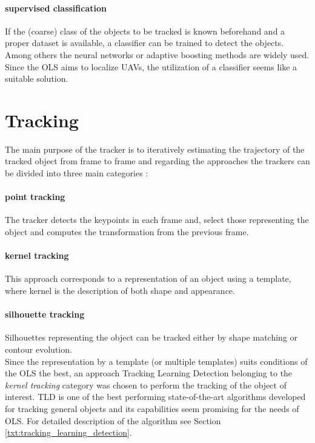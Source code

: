 \paragraph{supervised classification} If the (coarse) class of the objects to be tracked is known beforehand and a proper dataset is available, a classifier can be trained to detect the objects. Among others the neural networks or adaptive boosting methods are widely used. Since the OLS aims to localize UAVs, the utilization of a classifier seems like a suitable solution.

\section{Tracking}

The main purpose of the tracker is to iteratively estimating the trajectory of the tracked object from frame to frame and regarding the approaches the trackers can be divided into three main categories \cite{Yilmaz:2006:OTS:1177352.1177355}:

\paragraph{point tracking} 
The tracker detects the keypoints in each frame and, select those representing the object and computes the transformation from the previous frame.

\paragraph{kernel tracking} 
This approach corresponds to a representation of an object using a template, where kernel is the description of both shape and appearance.

\paragraph{silhouette tracking}
Silhouettes representing the object can be tracked either by shape matching or contour evolution. \\

Since the representation by a template (or multiple templates) suits conditions of the OLS the best, an approach Tracking Learning Detection belonging to the \textit{kernel tracking} category was chosen to perform the tracking of the object of interest. TLD is one of the best performing state-of-the-art algorithms developed for tracking general objects and its capabilities seem promising for the needs of OLS. For detailed description of the algorithm see Section \ref{txt:tracking_learning_detection}.

